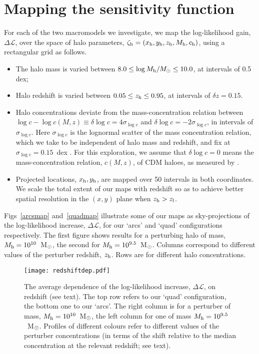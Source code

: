 \documentclass[a4paper, fleqn, usenatbib, useAMS]{mnras}
\def\zh{\zeta_{\rm h}}
\def\DL{\Delta\mathscr{L}}
\begin{document}
\section{Mapping the sensitivity function}

For each of the two macromodels we investigate, we map the log-likelihood gain, $\DL$, over the space of halo 
parameters, $\zh=(x_{\rm h}, y_{\rm h}, z_{\rm h}, M_{\rm h}, c_{\rm
  h})$, using a rectangular grid as follows. 
\begin{itemize}
\item{The halo mass is varied between $8.0\leq\log M_{\rm h}/M_{\rm \odot}\leq 10.0$, at intervals of 0.5 dex;}
\item{Halo redshift is varied between $0.05\leq z_{\rm h}\leq0.95$, at intervals of $\delta z = 0.15$. }
\item{Halo concentrations deviate from the mass-concentration relation between 
$\log c - \log c(M,z) \equiv \delta \log c = 4\sigma_{\log c}$ and  $\delta\log c = -2\sigma_{\log c}$, in intervals of $\sigma_{\log c}$. 
Here $\sigma_{\log c}$ is the lognormal scatter of the mass concentration relation, which we take to be independent of 
halo mass and redshift, and fix at $\sigma_{\log c}=0.15$~dex \citep{Wang2020}. 
For this exploration, we assume that $\delta \log c = 0$ means the
mass-concentration relation,  $c(M,z)$, of CDM haloes, 
as measured by \citet{Ludlow2016}.}
\item{Projected locations, $x_{\rm h}, y_{\rm h}$, are mapped over 50 intervals in both coordinates. We scale the total extent of our maps with redshift so as to achieve better
spatial resolution in the $(x,y)$ plane when $z_{\rm h}>z_{\rm l}$.}
\end{itemize}
Figs~\ref{arcsmap} and~\ref{quadmap} illustrate some of our maps as sky-projections of the log-likelihood 
increase, $\DL$, for our `arcs' and `quad' configurations respectively. The first figure shows results for a perturbing halo
of mass, $M_{\rm h}=10^{10}$~M$_{\rm \odot}$, the second for $M_{\rm h}=10^{9.5}$~M$_{\rm \odot}$.
Columns correspond to different values of the perturber redshift, $z_{\rm h}$. Rows are for different halo concentrations. 
 
 
\begin{figure}
\centering
\texttt{[image: redshiftdep.pdf]}
\caption{The average dependence of the log-likelihood increase, $\DL$, on redshift (see text). The top row refers to our `quad' configuration,
the bottom one to our `arcs'. The right column is for a perturber of
mass, $M_{\rm h}=10^{10}$~M$_{\rm \odot}$, the left column for one of mass $M_{\rm h}=10^{9.5}$~M$_{\rm \odot}$. Profiles of different colours refer to different values of the perturber concentrations (in terms of the shift relative to the median concentration at the relevant redshift; see text). }
\label{redshiftdep}
\end{figure}
\end{document}
